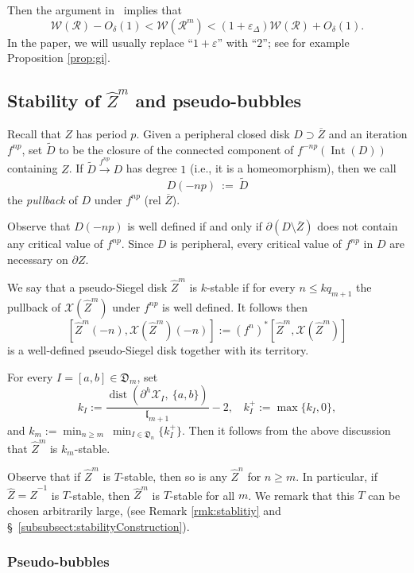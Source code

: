 \documentclass[11pt, reqno]{amsart}
\numberwithin{equation}{section}
\theoremstyle{plain}
\theoremstyle{theorem}
\theoremstyle{plain}
\theoremstyle{definition}
\DeclareMathOperator{\dist}{dist}
\DeclareMathOperator{\Int}{Int}
\numberwithin{figure}{section}
\renewcommand{\sp}{{\ \ }}
\newcommand{\Width}{{\mathcal W}}
\newcommand\RR{\mathcal{R}}
\newcommand\XX{\mathcal{X}}
\newcommand{\wZ}{{\widehat Z}}
\begin{document}
Then the argument in~\cite[Lemma 5.10]{DL22} implies that
\begin{equation}
\label{eq:RR vs RR^m}
\Width(\RR)-O_\delta (1) <\Width(\RR^m) <(1+\varepsilon_\Delta)\Width(\RR) +O_\delta(1).\end{equation}
In the paper, we will usually replace ``$1+\varepsilon$'' with ``$2$''; see for example Proposition \ref{prop:gi}.


\subsection{Stability of $\wZ^m$ and pseudo-bubbles}\label{subsec:stability}
 Recall that $Z$ has period $p$. Given a peripheral closed disk $D\supset \overline Z$ and an iteration $f^{np}$, set $\widetilde D$ to be the closure of the connected component of $f^{-np}(\Int(D))$ containing $Z$. If $\widetilde D\overset{f^{np}}{\longrightarrow} D$ has degree $1$ (i.e., it is a homeomorphism), then we call \[D(-np)\ :=\ \widetilde D\] the {\em pullback} of $D$ under $f^{np}$ (rel $\overline Z$). 


 

Observe that $D(-np)$ is well defined if and only if $\partial (D\setminus \overline Z)$ does not contain any critical value of $f^{np}$. Since $D$ is peripheral, every critical value of $f^{np}$ in $D$ are necessary on $\partial Z$.


We say that a pseudo-Siegel disk $\wZ^m$ is $k$-stable if for every $n\le k q_{m+1}$ the pullback of $\XX(\wZ^m)$ under $f^{np}$ is well defined. It follows then 
\[[\wZ^m(-n), \XX(\wZ^m)(-n)] :=(f^n)^*[\wZ^m, \XX(\wZ^m)]\]
is a well-defined pseudo-Siegel disk together with its territory.


For every $I=[a,b]\in \mathfrak D_m$, set \[k_I := \frac{\dist (\partial^h \XX_I, \ \{a,b\})}{\mathfrak{l}_{m+1}}-2,\sp \sp k_I^+:=\max \{k_I, 0\} ,\]
and $k_m :=\min_{n\ge m}\  \min_{I \in \mathfrak D_n} \{k^+_{I}\}$. Then it follows from the above discussion that $\wZ^m$ is $k_m$-stable.


Observe that if $\wZ^m$ is $T$-stable, then so is any $\wZ^n$ for $n\ge m$. In particular, if $\wZ = \wZ^{-1}$ is $T$-stable, then $\wZ^m$ is $T$-stable for all $m$.
We remark that this $T$ can be chosen arbitrarily large, (see Remark \ref{rmk:stablitiy} and \S~\ref{subsubsect:stabilityConstruction}).



\subsubsection{Pseudo-bubbles}
\end{document}
